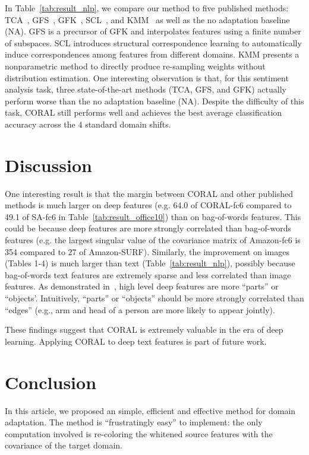 \documentclass[letterpaper]{article}
\begin{document}
In Table~\ref{tab:result_nlp}, we compare our method to five
published methods: TCA~\cite{tca}, GFS~\cite{gopalan-iccv11}, GFK~\cite{gfk}, SCL~\cite{scl}, and KMM~\cite{huang_nips06} as well as the no adaptation baseline (NA). GFS is a precursor of GFK and interpolates features using a finite number of subspaces. SCL introduces structural correspondence learning to automatically induce correspondences among features from different domains. KMM presents a nonparametric method to directly produce re-sampling weights without distribution estimation. One interesting observation is that, for this sentiment analysis task, three state-of-the-art methods (TCA, GFS, and GFK) actually perform worse than the no adaptation baseline (NA). Despite the difficulty of this task, CORAL still performs well and achieves the best average classification accuracy across the 4 standard domain shifts.

\section{Discussion}
One interesting result is that the margin between CORAL and other published methods is much larger on deep features (e.g. 64.0 of CORAL-fc6 compared to 49.1 of SA-fc6 in Table~\ref{tab:result_office10}) than on bag-of-words features. This could be because deep features are more strongly correlated than bag-of-words features (e.g. the largest singular value of the covariance matrix of Amazon-fc6 is 354 compared to 27 of Amazon-SURF). Similarly, the improvement on images (Tables 1-4) is much larger than text (Table~\ref{tab:result_nlp}), possibly because bag-of-words text features are extremely sparse and less correlated than image features.
As demonstrated in~\cite{deep_vis}, high level deep features are more ``parts'' or ``objects'. Intuitively, ``parts'' or ``objects'' should be more strongly correlated than ``edges'' (e.g., arm and head of a person are more likely to appear jointly).

These findings suggest that CORAL is extremely valuable in the era of deep learning. Applying CORAL to deep text features is part of future work.
\section{Conclusion}
\label{sec:concl}
In this article, we proposed an simple, efficient and effective method for domain adaptation. The method is ``frustratingly easy'' to implement: the only computation involved is re-coloring the whitened source features with the covariance of the target domain.
\end{document}
